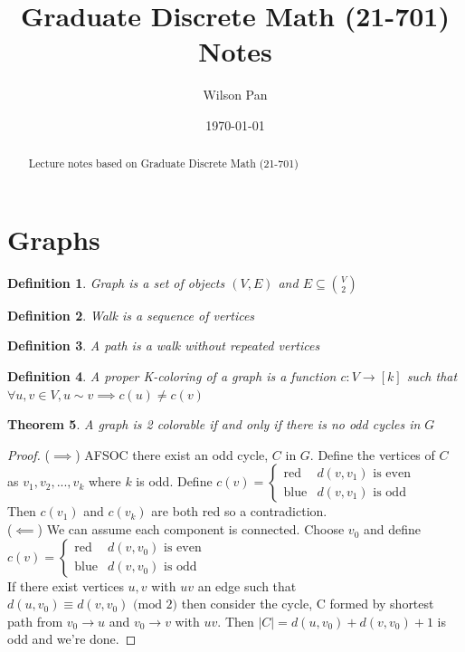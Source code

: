 \documentclass[a4paper]{article}
\title{Graduate Discrete Math (21-701) Notes}
\author{Wilson Pan}
\date{\today}
\newtheorem{thm}{Theorem}[section]
\newtheorem{defn}[thm]{Definition}
\begin{document}
\maketitle

\begin{abstract}
Lecture notes based on Graduate Discrete Math (21-701) 

\end{abstract}

\section{Graphs}
\begin{defn}
    Graph is a set of objects $(V,E)$ and $E\subseteq {V \choose 2}$
\end{defn}
\begin{defn}
    Walk is a sequence of vertices
\end{defn}
\begin{defn}
    A path is a walk without repeated vertices
\end{defn}
\begin{defn}
    A proper K-coloring of a graph is a function $c:V\to [k]$ such that $\forall u,v\in V, u \sim v\implies c(u)\neq c(v)$
\end{defn}
\begin{thm}
    A graph is 2 colorable if and only if there is no odd cycles in $G$
\end{thm}
\begin{proof}($\implies$) AFSOC there exist an odd cycle, $C$ in $G.$ Define the vertices of $C$ as $v_1,v_2,...,v_k$ where $k$ is odd. Define $c(v)=\begin{cases} 
    \text{red} & d(v,v_1) \text{ is even } \\ \text{blue} & d(v,v_1) \text{ is odd}
\end{cases}$\\
Then $c(v_1)$ and $c(v_k)$ are both red so a contradiction.
\\
($\impliedby$) We can assume each component is connected. Choose $v_0$ and define $c(v)=\begin{cases} 
    \text{red} & d(v,v_0) \text{ is even } \\ \text{blue} & d(v,v_0) \text{ is odd} 
\end{cases}$\\ 
If there exist vertices $u,v$ with $uv$ an edge such that $d(u,v_0)\equiv d(v,v_0) \text{ (mod 2)}$ then consider the cycle, C formed by shortest path from $v_0\to u$ and $v_0\to v$ with $uv.$ Then $|C|=d(u,v_0)+d(v,v_0)+1$ is odd and we're done.
\end{proof}
\end{document}
